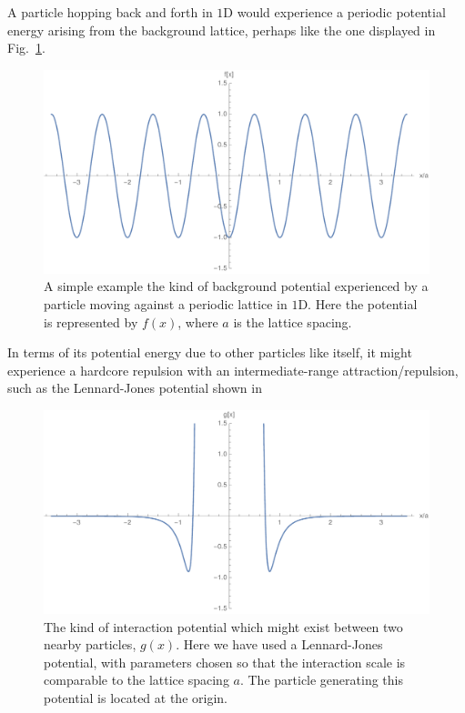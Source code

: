 A particle hopping back and forth in $1$D would experience a periodic potential energy arising from the 
background lattice, perhaps like the one displayed in Fig.~\ref{fig:periodicPot}.
\begin{figure} \caption[An impression of the kind of background potential experienced by a particle moving
against a periodic lattice in $1$D.]{A simple example the kind of background potential experienced by a 
particle moving against a periodic lattice in $1$D. Here the potential is represented by $f(x)$, where $a$
is the lattice spacing.} 
\label{fig:periodicPot}
\begin{center}
\includegraphics[width=1.0\textwidth]{intro/images/fPlot}
\end{center}
\end{figure}
In terms of its potential
energy due to other particles like itself, it might experience a hardcore repulsion with an 
intermediate-range attraction/repulsion, such as the Lennard-Jones potential shown in 
\begin{figure} \caption[The kind of interaction potential which might exist between two nearby particles.]{The kind of interaction potential which might exist between two nearby particles, $g(x)$. Here we have 
used a Lennard-Jones potential, with parameters chosen so that the interaction scale is comparable to the
lattice spacing $a$. The particle generating this potential is located at the origin.} 
\label{fig:partInteraction}
\begin{center}
\includegraphics[width=1.0\textwidth]{intro/images/gPlot}
\end{center}
\end{figure}
